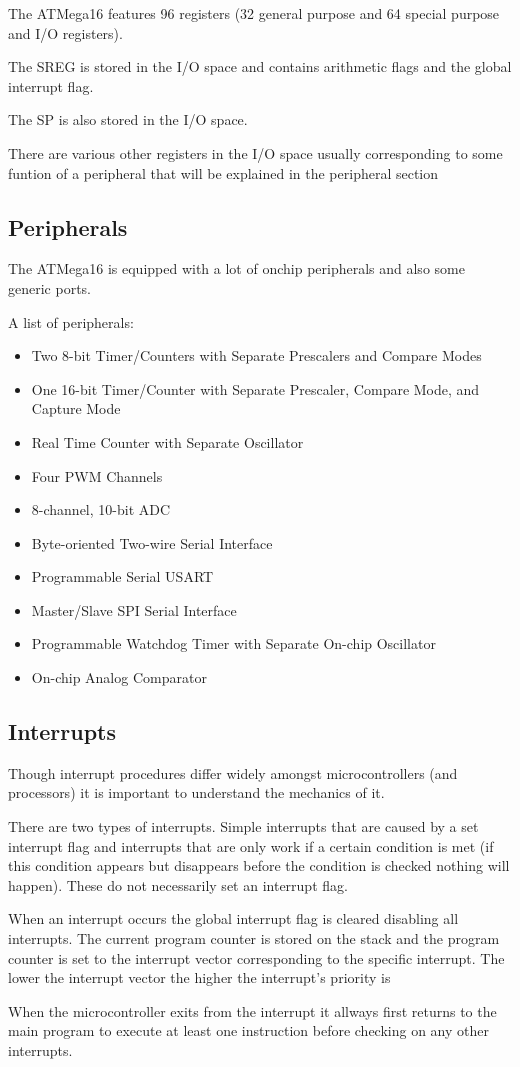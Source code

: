 The ATMega16 features 96 registers (32 general purpose and 64 special 
purpose and I/O registers).

The \ac{SREG} is stored in the I/O space and contains arithmetic flags
and the global interrupt flag.

The \ac{SP} is also stored in the I/O space.

There are various other registers in the I/O space usually corresponding
to some funtion of a peripheral that will be explained in the peripheral
section

\subsection{Peripherals}

The ATMega16 is equipped with a lot of onchip peripherals and also some
generic ports.

A list of peripherals:
\begin{itemize}
\item{Two 8-bit Timer/Counters with Separate Prescalers and Compare Modes} 
\item{One 16-bit Timer/Counter with Separate Prescaler, Compare Mode, and Capture Mode}
\item{Real Time Counter with Separate Oscillator}
\item{Four PWM Channels}
\item{8-channel, 10-bit ADC}
\item{Byte-oriented Two-wire Serial Interface}
\item{Programmable Serial USART}
\item{Master/Slave SPI Serial Interface}
\item{Programmable Watchdog Timer with Separate On-chip Oscillator}
\item{On-chip Analog Comparator}
\end{itemize}

\subsection{Interrupts}

Though interrupt procedures differ widely amongst microcontrollers (and processors)
it is important to understand the mechanics of it. 

There are two types of interrupts. Simple interrupts that are caused by a set 
interrupt flag and interrupts that are only work if a certain condition is met 
(if this condition appears but disappears before the condition is checked nothing 
will happen). These do not necessarily set an interrupt flag.

When an interrupt occurs the global interrupt flag is cleared disabling all 
interrupts. The current program counter is stored on the stack and the 
program counter is set to the interrupt vector corresponding to the specific 
interrupt. The lower the interrupt vector the higher the interrupt's priority is

When the microcontroller exits from the interrupt it allways first returns to the
main program to execute at least one instruction before checking on any other
interrupts.
